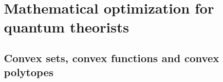 \chapter{Mathematical optimization for quantum theorists}
\thispagestyle{empty}  %
	
	\section{Convex sets, convex functions and convex polytopes}
		\lipsum[2-4]
